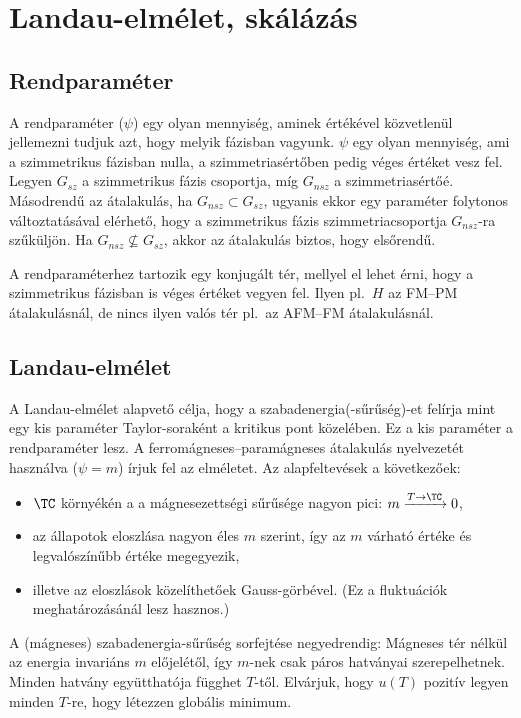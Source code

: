 \chapter{Landau-elm\'elet, sk\'al\'az\'as} 

 \section{Rendparaméter}
   
  A rendparaméter ($\psi$) egy olyan mennyiség, aminek értékével közvetlenül jellemezni tudjuk azt, hogy melyik fázisban vagyunk. $\psi$ egy olyan mennyiség, ami a szimmetrikus fázisban nulla, a szimmetriasértőben pedig véges értéket vesz fel.
   Legyen $G_{sz}$ a szimmetrikus fázis csoportja, míg $G_{nsz}$ a szimmetriasértőé.
   Másodrendű az átalakulás, ha $G_{nsz}\subset G_{sz}$, ugyanis ekkor egy paraméter folytonos változtatásával elérhető, hogy a szimmetrikus fázis szimmetriacsoportja $G_{nsz}$-ra szűküljön.
   Ha $G_{nsz}\nsubseteq G_{sz}$, akkor az átalakulás biztos, hogy elsőrendű.
  
  A rendparaméterhez tartozik egy konjugált tér, mellyel el lehet érni, hogy a szimmetrikus fázisban is véges értéket vegyen fel.
   Ilyen pl.\ $H$ az FM--PM átalakulásnál, de nincs ilyen valós tér pl.\ az AFM--FM átalakulásnál. 
 
 \section{Landau-elmélet}
 
  A Landau-elmélet alapvető célja, hogy a szabadenergia(-sűrűség)-et felírja mint egy kis paraméter Taylor-soraként a kritikus pont közelében.
   Ez a kis paraméter a rendparaméter lesz.
   A ferromágneses--paramágneses átalakulás nyelvezetét használva ($\psi=m$) írjuk fel az elméletet.
   Az alapfeltevések a következőek:
  \begin{itemize}
   \item $\TC$ környékén a a mágnesezettségi sűrűsége nagyon pici: $m\xrightarrow{T\to\TC}0$,
   \item az állapotok eloszlása nagyon éles $m$ szerint, így az $m$ várható értéke és legvalószínűbb értéke megegyezik,
   \item illetve az eloszlások közelíthetőek Gauss-görbével. (Ez a fluktuációk meghatározásánál lesz hasznos.)
  \end{itemize}
  
  A (mágneses) szabadenergia-sűrűség sorfejtése negyedrendig:
  Mágneses tér nélkül az energia invariáns $m$ előjelétől, így $m$-nek csak páros hatványai szerepelhetnek.
   Minden hatvány együtthatója függhet $T$-től.
   Elvárjuk, hogy $u(T)$ pozitív legyen minden $T$-re, hogy létezzen globális minimum. 
  
